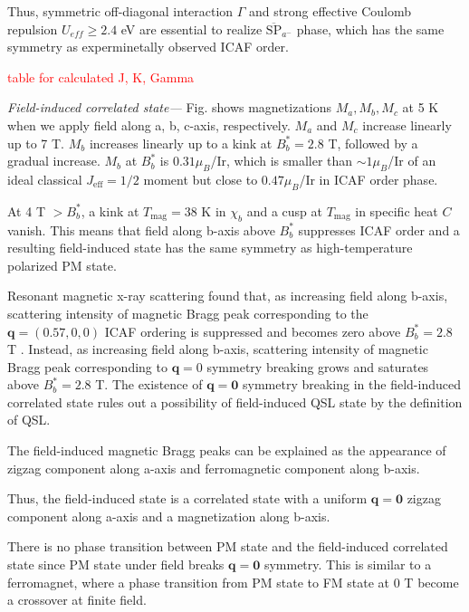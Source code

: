 Thus, symmetric off-diagonal interaction $\Gamma$ and strong effective Coulomb repulsion $U_{eff} \geq 2.4$ eV are essential to realize $\overline{\mathrm{SP}}_{a^-}$ phase, which has the same symmetry as experminetally observed ICAF order.

\textcolor{red}{table for calculated J, K, Gamma}

\vspace{3mm}
\noindent\textit{Field-induced correlated state---} Fig. shows magnetizations $M_a, M_b, M_c$ at 5 K when we apply field along a, b, c-axis, respectively.
$M_a$ and $M_c$ increase linearly up to 7 T.
$M_b$ increases linearly up to a kink at $B_b^* = 2.8$ T, followed by a gradual increase.
$M_b$ at $B_b^*$ is $0.31 \mu_B$/Ir, which is smaller than $\sim 1 \mu_B$/Ir of an ideal classical $J_{\mathrm{eff}} = 1/2$ moment but close to $0.47 \mu_B$/Ir in ICAF order phase.

At 4 T $> B_b^*$, a kink at $T_\mathrm{mag} = 38$ K in $\chi_b$ and a cusp at $T_\mathrm{mag}$ in specific heat $C$ vanish.
This means that field along b-axis above $B_b^*$ suppresses ICAF order and a resulting field-induced state has the same symmetry as high-temperature polarized PM state.

Resonant magnetic x-ray scattering found that, as increasing field along b-axis, scattering intensity of magnetic Bragg peak corresponding to the $\bm{q} = (0.57, 0, 0)$ ICAF ordering is suppressed and becomes zero above $B_b^* = 2.8$ T \cite{ruiz2017correlated}.
Instead, as increasing field along b-axis, scattering intensity of magnetic Bragg peak corresponding to $\bm{q} = 0$ symmetry breaking grows and saturates above $B_b^* = 2.8$ T.
The existence of $\bm{q} = \bm{0}$ symmetry breaking in the field-induced correlated state rules out a possibility of field-induced QSL state by the definition of QSL.

The field-induced magnetic Bragg peaks can be explained as the appearance of zigzag component along a-axis and ferromagnetic component along b-axis.

Thus, the field-induced state is a correlated state with a uniform $\bm{q} = \bm{0}$ zigzag component along a-axis and a magnetization along b-axis.

There is no phase transition between PM state and the field-induced correlated state since PM state under field breaks $\bm{q} = \bm{0}$ symmetry.
This is similar to a ferromagnet, where a phase transition from PM state to FM state at 0 T become a crossover at finite field.

